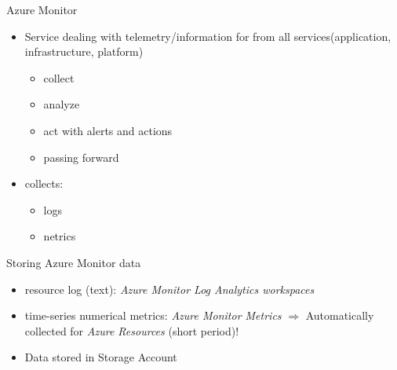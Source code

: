 

\begin{flashcard}[Definition]{Azure Monitor}
  \begin{itemize}
    \item Service dealing with telemetry/information for from all services\newline (application, infrastructure, platform)
      \begin{itemize}
        \item collect
        \item analyze
        \item act with alerts and actions
        \item passing forward
      \end{itemize}
 
    \item collects:
      \begin{itemize}
        \item logs
        \item netrics
      \end{itemize}
  \end{itemize}
\end{flashcard}

\begin{flashcard}[Definition]{Storing Azure Monitor data}
  \begin{itemize}
    \item resource log (text): \emph{Azure Monitor Log Analytics workspaces}
    \item time-series numerical metrics: \emph{Azure Monitor Metrics}\newline
      $\Rightarrow$ Automatically collected for \emph{Azure Resources} (short period)!
    \item Data stored in Storage Account
  \end{itemize}
\end{flashcard}


